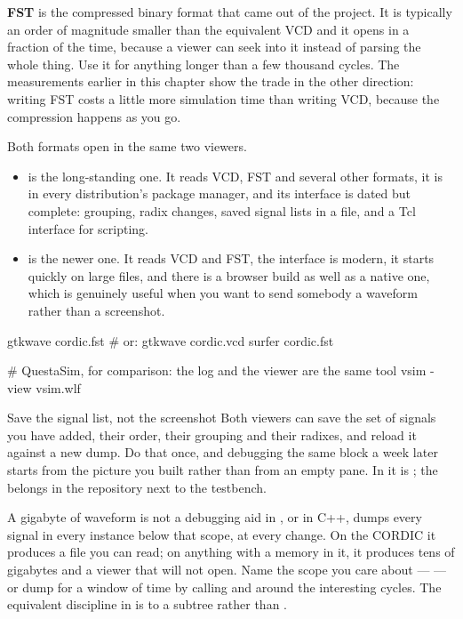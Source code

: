 \textbf{FST} is the compressed binary format that came out of the 
project. It is typically an order of magnitude smaller than the equivalent VCD
and it opens in a fraction of the time, because a viewer can seek into it
instead of parsing the whole thing. Use it for anything longer than a few
thousand cycles. The measurements earlier in this chapter show the trade in the
other direction: writing FST costs a little more simulation time than writing
VCD, because the compression happens as you go.

Both formats open in the same two viewers.

\begin{itemize}
  \item {} is the long-standing one. It reads VCD, FST and several
        other formats, it is in every distribution's package manager, and its
        interface is dated but complete: grouping, radix changes, saved signal
        lists in a  file, and a Tcl interface for scripting.
  \item {} is the newer one. It reads VCD and FST, the interface is
        modern, it starts quickly on large files, and there is a browser build
        as well as a native one, which is genuinely useful when you want to
        send somebody a waveform rather than a screenshot.
\end{itemize}

\begin{shcode}
gtkwave cordic.fst          # or: gtkwave cordic.vcd
surfer   cordic.fst

# QuestaSim, for comparison: the log and the viewer are the same tool
vsim -view vsim.wlf
\end{shcode}

\begin{tipbox}{Save the signal list, not the screenshot}
Both viewers can save the set of signals you have added, their order, their
grouping and their radixes, and reload it against a new dump. Do that once, and
debugging the same block a week later starts from the picture you built rather
than from an empty pane. In  it is ; the  belongs in the repository next to the testbench.
\end{tipbox}

\begin{gotcha}{A gigabyte of waveform is not a debugging aid}
 in \SV{}, or  in C++, dumps
every signal in every instance below that scope, at every change. On the CORDIC
it produces a file you can read; on anything with a memory in it, it produces
tens of gigabytes and a viewer that will not open. Name the scope you care
about ---  --- or dump for a window of time by
calling  and  around the interesting cycles.
The equivalent discipline in  is to  a subtree
rather than .
\end{gotcha}

